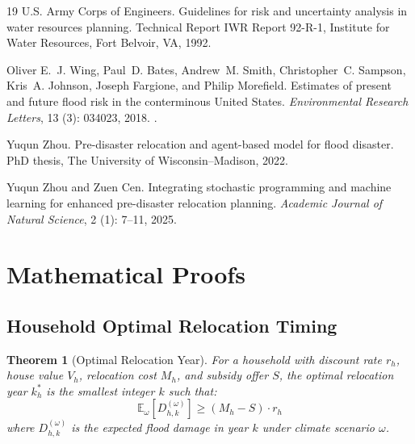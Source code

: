 \documentclass[11pt,letterpaper]{article}
\newtheorem{theorem}{Theorem}
\theoremstyle{definition}
\newcommand{\E}{\mathbb{E}}
\begin{document}
\begin{thebibliography}{19}
{U.S. Army Corps of Engineers}.
\newblock Guidelines for risk and uncertainty analysis in water resources
  planning.
\newblock Technical Report IWR Report 92-R-1, Institute for Water Resources,
  Fort Belvoir, VA, 1992.

Oliver E.~J. Wing, Paul~D. Bates, Andrew~M. Smith, Christopher~C. Sampson,
  Kris~A. Johnson, Joseph Fargione, and Philip Morefield.
\newblock Estimates of present and future flood risk in the conterminous
  {United States}.
\newblock \emph{Environmental Research Letters}, 13 (3):
  034023, 2018.
\newblock {}.

Yuqun Zhou.
\newblock Pre-disaster relocation and agent-based model for flood disaster.
\newblock PhD thesis, The University of Wisconsin--Madison, 2022.

Yuqun Zhou and Zuen Cen.
\newblock Integrating stochastic programming and machine learning for enhanced
  pre-disaster relocation planning.
\newblock \emph{Academic Journal of Natural Science}, 2 (1):
  7--11, 2025.

\end{thebibliography}


\appendix

\section{Mathematical Proofs}
\label{app:proofs}

\subsection{Household Optimal Relocation Timing}

\begin{theorem}[Optimal Relocation Year]
For a household with discount rate $r_h$, house value $V_h$, relocation cost $M_h$, and subsidy offer $S$, the optimal relocation year $k_h^*$ is the smallest integer $k$ such that:
\begin{equation}
\E_\omega[D_{h,k}^{(\omega)}] \geq (M_h - S) \cdot r_h
\end{equation}
where $D_{h,k}^{(\omega)}$ is the expected flood damage in year $k$ under climate scenario $\omega$.
\end{theorem}
\end{document}
